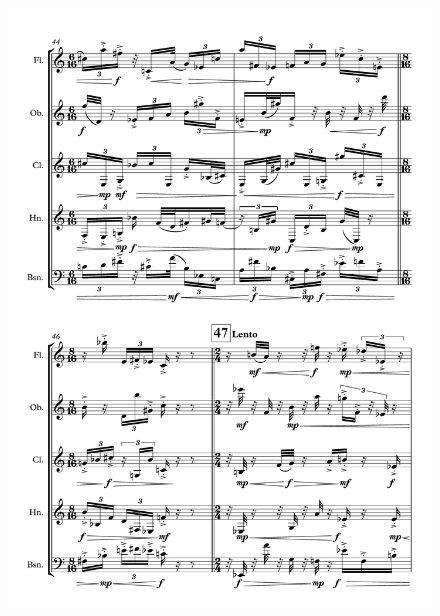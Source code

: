 \begin{figure}[H]
    \centering
	\includegraphics[width=6.5in]{figures/Out_of_Focus_9.pdf}
\end{figure}

